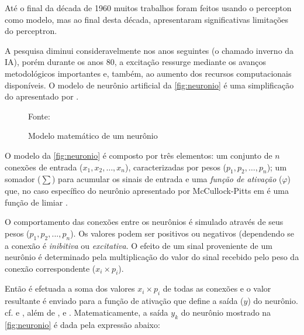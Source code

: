 Até o final da década de 1960 muitos trabalhos foram feitos usando o percepton como modelo, mas ao final desta década,  apresentaram significativas limitações do perceptron. 

A pesquisa diminui consideravelmente nos anos seguintes (o chamado inverno da IA), porém durante  os  anos  80,  a excitação	ressurge mediante os avanços metodológicos importantes e, também, ao aumento dos recursos computacionais disponíveis. O  modelo  de  neurônio  artificial  da \autoref{fig:neuronio} é uma simplificação do apresentado por .

\begin{figure}[h!]
	\centering
	\caption{Modelo matemático de um neurônio}
	
	{\scriptsize 	Fonte: }	
	\label{fig:neuronio}
\end{figure}

O modelo da \autoref{fig:neuronio} é composto por três elementos:  um conjunto de $ n $ conexões de entrada ($ x_1, x_2, \dots , x_n $), caracterizadas por pesos ($ p_1, p_2, \dots, p_n $); um somador ($ \sum $) para acumular os sinais de entrada e uma \textit{função de ativação} ($\varphi$) que, no caso específico do neurônio apresentado por McCullock-Pitts em  é uma função de limiar \cite{ferneda_redes_2006, lima_ia_2016}.

O comportamento das conexões entre os neurônios é simulado através de seus pesos  ($ p_1, p_2, ..., p_n $). Os valores podem ser positivos ou negativos (dependendo se a conexão é \textit{inibitiva} ou \textit{excitativa}. O efeito de um sinal proveniente de um neurônio é determinado pela multiplicação do valor do sinal recebido pelo peso da conexão correspondente ($x_i \times p_i$).

Então é efetuada a soma dos valores $x_i \times p_i$ de todas as conexões e o valor resultante é enviado para a função de ativação que define a saída ($y$) do neurônio. cf.  e , além de ,  e . Matematicamente, a saída $y_k$ do neurônio mostrado na \autoref{fig:neuronio} é dada pela expressão abaixo:

